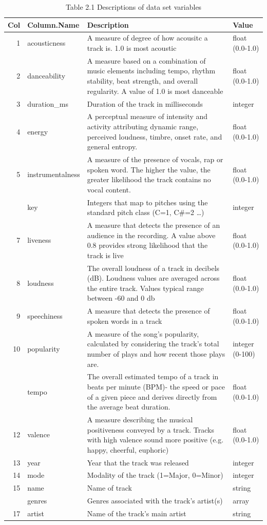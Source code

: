 \documentclass[
]{article}
\begin{document}
\begin{table}[!h]

\caption{\label{tab:unnamed-chunk-4}Table 2.1 Descriptions of data set variables}
\centering
\fontsize{9}{11}\selectfont
\begin{tabular}[t]{rl>{\raggedright\arraybackslash}p{10cm}l}
\toprule
Col & Column.Name & Description & Value\\
\midrule
1 & acousticness & A measure of degree of how acousitc a track is. 1.0 is most acoustic & float (0.0-1.0)\\
2 & danceability & A measure  based on a combination of music elements including tempo, rhythm stability, beat strength, and overall regularity. A value of 1.0 is most danceable & float (0.0-1.0)\\
3 & duration\_ms & Duration of the track in milliseconds & integer\\
4 & energy & A perceptual measure of intensity and activity attributing dynamic range, perceived loudness, timbre, onset rate, and general entropy. & float (0.0-1.0)\\
5 & instrumentalness & A measure of the presence of vocals, rap or spoken word. The higher the value, the greater likelihood the track contains no vocal content. & float (0.0-1.0)\\
\addlinespace
6 & key & Integers that  map to pitches using the standard pitch class (C=1, C\#=2 …) & integer\\
7 & liveness & A measure that detects the presence of an audience in the recording.  A value above 0.8 provides strong likelihood that the track is live & float (0.0-1.0)\\
8 & loudness & The overall loudness of a track in decibels (dB). Loudness values are averaged across the entire track.  Values typical range between -60 and 0 db & float (0.0-1.0)\\
9 & speechiness & A measure that detects the presence of spoken words in a track & float (0.0-1.0)\\
10 & popularity & A measure of the song's popularity, calculated by considering the track's total number of plays and how recent those plays are. & integer (0-100)\\
\addlinespace
11 & tempo & The overall estimated tempo of a track in beats per minute (BPM)- the speed or pace of a given piece and derives directly from the average beat duration. & float (0.0-1.0)\\
12 & valence & A measure  describing the musical positiveness conveyed by a track. Tracks with high valence sound more positive (e.g. happy, cheerful, euphoric) & float (0.0-1.0)\\
13 & year & Year that the track was released & integer\\
14 & mode & Modality of the track (1=Major, 0=Minor) & integer\\
15 & name & Name of track & string\\
\addlinespace
16 & genres & Genres associated with the track's artist(s) & array\\
17 & artist & Name of the track's main artist & string\\
\bottomrule
\end{tabular}
\end{table}
\end{document}
